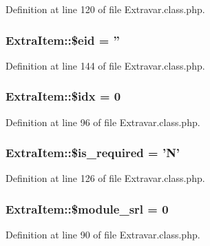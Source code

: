 Definition at line 120 of file Extravar.\-class.\-php.

\hypertarget{classExtraItem_a8a68f26bb602679ebf4095e774425092}{
\subsubsection[{\$eid}]{\setlength{\rightskip}{0pt plus 5cm}Extra\-Item\-::\$eid = ''}}\label{classExtraItem_a8a68f26bb602679ebf4095e774425092}


Definition at line 144 of file Extravar.\-class.\-php.

\hypertarget{classExtraItem_aadcda4aa903481b261d86bc50ab1c238}{
\subsubsection[{\$idx}]{\setlength{\rightskip}{0pt plus 5cm}Extra\-Item\-::\$idx = 0}}\label{classExtraItem_aadcda4aa903481b261d86bc50ab1c238}


Definition at line 96 of file Extravar.\-class.\-php.

\hypertarget{classExtraItem_a616da9975ea87e9b61b6b9a2daf5e769}{
\subsubsection[{\$is\-\_\-required}]{\setlength{\rightskip}{0pt plus 5cm}Extra\-Item\-::\$is\-\_\-required = 'N'}}\label{classExtraItem_a616da9975ea87e9b61b6b9a2daf5e769}


Definition at line 126 of file Extravar.\-class.\-php.

\hypertarget{classExtraItem_a21cce86c0846b13228273314216e5ab9}{
\subsubsection[{\$module\-\_\-srl}]{\setlength{\rightskip}{0pt plus 5cm}Extra\-Item\-::\$module\-\_\-srl = 0}}\label{classExtraItem_a21cce86c0846b13228273314216e5ab9}


Definition at line 90 of file Extravar.\-class.\-php.

